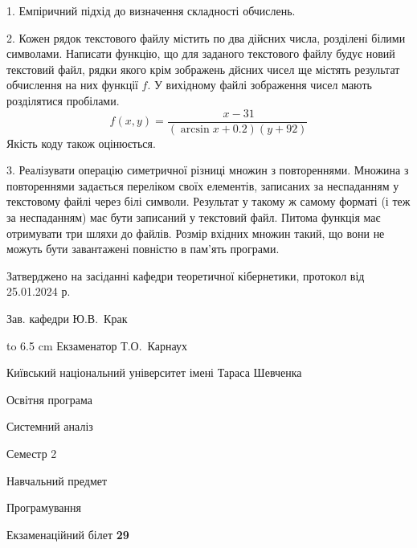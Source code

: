 \documentclass[12pt, ukrainian]{article}
\begin{document}
{%
1. Емпіричний підхід до визначення складності обчислень.%
\par
\vspace{2mm}

2. Кожен рядок текстового файлу містить по два дійсних числа, розділені білими символами.
Написати функцію, що для заданого текстового файлу будує новий текстовий файл, рядки якого крім зображень дйсних чисел ще містять результат обчислення на них функції $f$. У вихідному файлі зображення чисел мають розділятися пробілами. 
$$f(x, y) =\frac{\ x - 31}{(\arcsin x + 0.2) (y + 92)}$$ 
Якість коду також оцінюється.

\par
\vspace{2mm}

3. Реалізувати операцію симетричної різниці множин з повтореннями. Множина з повтореннями задається переліком своїх елементів, записаних за неспаданням у текстовому файлі через білі символи. Результат у такому ж самому форматі (і теж за неспаданням) має бути записаний у текстовий файл. Питома функція має отримувати три шляхи до файлів. Розмір вхідних множин такий, що вони не можуть бути завантажені повністю в пам’ять програми.

}
{\smallskip\smallskip \begin {scriptsize} Затверджено на засіданні кафедри теоретичної кібернетики, протокол   від   25.01.2024 р.\par\smallskip\smallskip\smallskip\smallskip
{\parbox {6.5 cm} {Зав. кафедри \dotfill Ю.В.~Крак}}\hspace {0.7cm} {\hbox to 6.5 cm { Екзаменатор \dotfill Т.О.~Карнаух}} \end{scriptsize}}
\newpage
{{\begin {scriptsize}\par
{ \center  Київський національний університет імені Тараса Шевченка \par}
{\parbox {5 cm}{Освітня програма \hfill}{\parbox {7 cm}{Системний аналіз\hfill}}\parbox {6 cm}{\hfill Семестр 2}}\par
{\parbox {5 cm} {Навчальний предмет \hfill}\parbox {7 cm}{Програмування \hfill}\parbox {6cm}{\hfill}\par}\vspace{-15pt} \end{scriptsize}}{\center Екзаменаційний білет \No \textbf { 29 }\par}}
\end{document}
